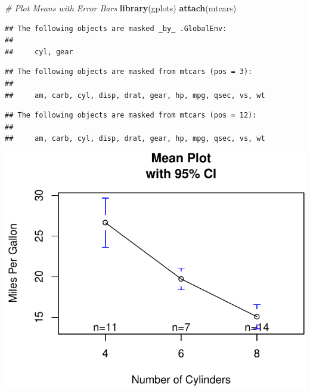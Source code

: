 \documentclass[]{article}
\newenvironment{Shaded}{\begin{snugshade}}{\end{snugshade}}
\newcommand{\KeywordTok}[1]{\textcolor[rgb]{0.13,0.29,0.53}{\textbf{{#1}}}}
\newcommand{\DataTypeTok}[1]{\textcolor[rgb]{0.13,0.29,0.53}{{#1}}}
\newcommand{\CharTok}[1]{\textcolor[rgb]{0.31,0.60,0.02}{{#1}}}
\newcommand{\StringTok}[1]{\textcolor[rgb]{0.31,0.60,0.02}{{#1}}}
\newcommand{\CommentTok}[1]{\textcolor[rgb]{0.56,0.35,0.01}{\textit{{#1}}}}
\newcommand{\NormalTok}[1]{{#1}}
\numberwithin{equation}{section}
\begin{document}
\begin{Shaded}
\begin{Highlighting}[]
\CommentTok{# Plot Means with Error Bars}
\KeywordTok{library}\NormalTok{(gplots)}
\KeywordTok{attach}\NormalTok{(mtcars)}
\end{Highlighting}
\end{Shaded}

\begin{verbatim}
## The following objects are masked _by_ .GlobalEnv:
## 
##     cyl, gear
\end{verbatim}

\begin{verbatim}
## The following objects are masked from mtcars (pos = 3):
## 
##     am, carb, cyl, disp, drat, gear, hp, mpg, qsec, vs, wt
\end{verbatim}

\begin{verbatim}
## The following objects are masked from mtcars (pos = 12):
## 
##     am, carb, cyl, disp, drat, gear, hp, mpg, qsec, vs, wt
\end{verbatim}

\begin{Shaded}
\end{Shaded}

\includegraphics{index_files/figure-latex/unnamed-chunk-224-1.pdf}
\end{document}
